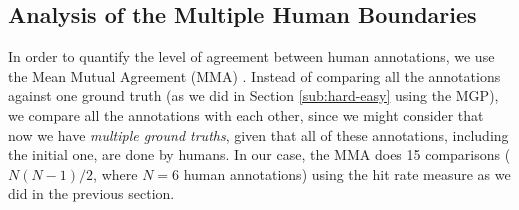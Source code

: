 \documentclass{article}
\begin{document}







\subsection{Analysis of the Multiple Human Boundaries}

In order to quantify the level of agreement between human annotations, we use the Mean Mutual Agreement (MMA) \cite{Holzapfel2012}.
Instead of comparing all the annotations against one ground truth (as we did in Section \ref{sub:hard-easy} using the MGP), we compare all the annotations with each other, since we might consider that now we have \textit{multiple ground truths}, given that all of these annotations, including the initial one, are done by humans.
In our case, the MMA does 15 comparisons ($N(N-1)/2$, where $N=6$ human annotations) using the hit rate measure as we did in the previous section.
\end{document}
